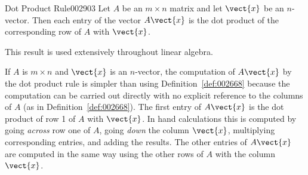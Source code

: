 \begin{theorem}{Dot Product Rule}{002903}
Let $A$ be an $m \times n$ matrix and let $\vect{x}$ be an $n$-vector. Then each entry of the vector $A\vect{x}$ is the dot product of the corresponding row of $A$ with $\vect{x}$.
\end{theorem}

\noindent This result is used extensively throughout linear algebra.

If $A$ is $m \times n$ and $\vect{x}$ is an $n$-vector, the computation of $A\vect{x}$ by the dot product rule is simpler than using Definition~\ref{def:002668} because the computation can be carried out directly with no explicit reference to the columns of $A$ (as in Definition~\ref{def:002668}). The first entry of $A\vect{x}$ is the dot product of row 1 of $A$ with $\vect{x}$. In hand calculations this is computed by going \textit{across} row one of $A$, going \textit{down} the column $\vect{x}$, multiplying corresponding entries, and adding the results. The other entries of $A\vect{x}$ are computed in the same way using the other rows of $A$ with the column $\vect{x}$.

